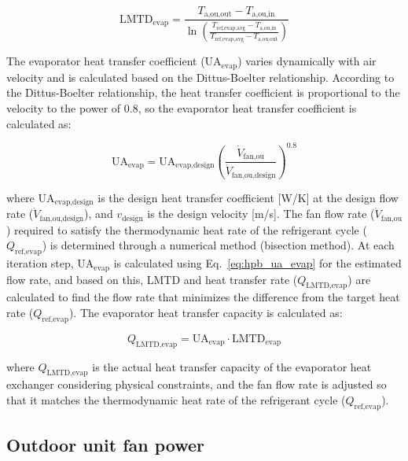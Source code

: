 \documentclass[letterpaper,10pt]{article}
\begin{document}
\begin{equation}
\label{eq:hpb_lmtd_evap}
\text{LMTD}_{\text{evap}} = \frac{T_{\text{a,ou,out}} - T_{\text{a,ou,in}}}{\ln\left(\frac{T_{\text{ref,evap,avg}} - T_{\text{a,ou,in}}}{T_{\text{ref,evap,avg}} - T_{\text{a,ou,out}}}\right)}
\end{equation}

The evaporator heat transfer coefficient ($\text{UA}_{\text{evap}}$) varies dynamically with air velocity and is calculated based on the Dittus-Boelter relationship. According to the Dittus-Boelter relationship, the heat transfer coefficient is proportional to the velocity to the power of 0.8, so the evaporator heat transfer coefficient is calculated as:

\begin{equation}
\label{eq:hpb_ua_evap}
\text{UA}_{\text{evap}} = \text{UA}_{\text{evap,design}} \left(\frac{\dot{V}_{\text{fan,ou}}}{\dot{V}_{\text{fan,ou,design}}}\right)^{0.8}
\end{equation}

where $\text{UA}_{\text{evap,design}}$ is the design heat transfer coefficient [W/K] at the design flow rate ($\dot{V}_{\text{fan,ou,design}}$), and $v_{\text{design}}$ is the design velocity [m/s]. The fan flow rate ($\dot{V}_{\text{fan,ou}}$) required to satisfy the thermodynamic heat rate of the refrigerant cycle ($Q_{\text{ref,evap}}$) is determined through a numerical method (bisection method). At each iteration step, $\text{UA}_{\text{evap}}$ is calculated using Eq.~\eqref{eq:hpb_ua_evap} for the estimated flow rate, and based on this, LMTD and heat transfer rate ($Q_{\text{LMTD,evap}}$) are calculated to find the flow rate that minimizes the difference from the target heat rate ($Q_{\text{ref,evap}}$). The evaporator heat transfer capacity is calculated as:

\begin{equation}
\label{eq:hpb_q_lmtd_evap}
Q_{\text{LMTD,evap}} = \text{UA}_{\text{evap}} \cdot \text{LMTD}_{\text{evap}}
\end{equation}

where $Q_{\text{LMTD,evap}}$ is the actual heat transfer capacity of the evaporator heat exchanger considering physical constraints, and the fan flow rate is adjusted so that it matches the thermodynamic heat rate of the refrigerant cycle ($Q_{\text{ref,evap}}$).

\subsection{Outdoor unit fan power}
\end{document}
